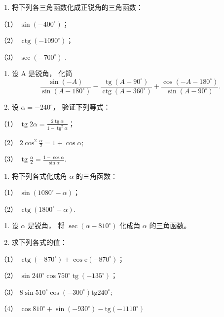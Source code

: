 \begin{enumerate}[start=2]
\item
  将下列各三角函数化成正锐角的三角函数：
\end{enumerate}

（1） \(\sin(-400^{\circ})\)；

（2） \(\operatorname{ctg}(-1090^{\circ})\)；

（3） \(\sec(-700^{\circ})\) .

\begin{enumerate}[start=3]
\item
  设 A 是锐角， 化简
\[
\frac {\sin (- A)}{\sin (A - 180 ^{\circ})} - \frac {\operatorname{tg} (A - 90 ^{\circ})}{\operatorname{ctg} (A - 360 ^{\circ})} + \frac {\cos (- A - 180 ^{\circ})}{\sin (A - 90 ^{\circ})}.
\]
\item
  设 \(\alpha = -240^{\circ}\)， 验证下列等式：
\end{enumerate}

（1）
\(\operatorname{tg} 2\alpha = \frac{2\operatorname{tg}\alpha}{1 - \operatorname{tg}^2\alpha}\)；

（2） \(2\cos^2\frac{\alpha}{2} = 1 + \cos \alpha ;\)

（3）
\(\operatorname{tg} \frac{\alpha}{2} = \frac{1 - \cos \alpha}{\sin \alpha}\).

\begin{enumerate}[start=5]
\item
  将下列各式化成角 \(\alpha\) 的三角函数：
\end{enumerate}

（1） \(\sin (1080^{\circ} - \alpha)\)；

（2） \(\operatorname{ctg}(1800^{\circ} - \alpha)\).

\begin{enumerate}[start=6]
\item
  设 \(\alpha\) 是锐角， 将 \(\sec (\alpha - 810^{\circ})\) 化成角
  \(\alpha\) 的三角函数。
\item
  求下列各式的值：
\end{enumerate}

（1）
\(\operatorname{ctg}(-870^{\circ}) + \cos \mathrm{e}(-870^{\circ})\)；

（2）
\(\sin 240^{\circ} \cos 750^{\circ} \operatorname{tg}(-135^{\circ})\)；

（3） \(8\sin 510^{\circ}\cos (-300^{\circ})\mathrm{tg}240^{\circ};\)

（4）
\(\cos 810^{\circ} + \sin (-930^{\circ}) - \mathrm{tg}(-1110^{\circ})\)

